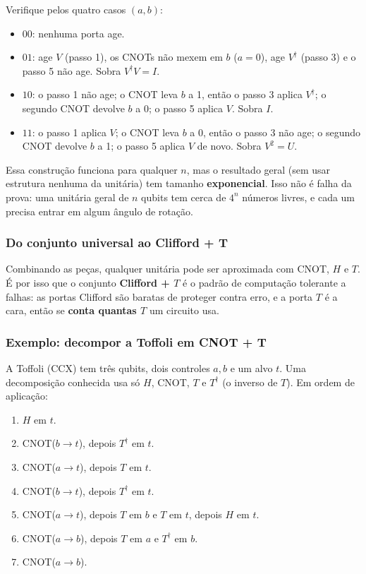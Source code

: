 Verifique pelos quatro casos \((a,b)\):

\begin{itemize}
\tightlist
\item
  \(00\): nenhuma porta age.
\item
  \(01\): age \(V\) (passo 1), os CNOTs não mexem em \(b\) (\(a=0\)), age \(V^\dagger\) (passo 3) e o passo 5 não age. Sobra \(V^\dagger V = I\).
\item
  \(10\): o passo 1 não age; o CNOT leva \(b\) a 1, então o passo 3 aplica \(V^\dagger\); o segundo CNOT devolve \(b\) a 0; o passo 5 aplica \(V\). Sobra \(I\).
\item
  \(11\): o passo 1 aplica \(V\); o CNOT leva \(b\) a 0, então o passo 3 não age; o segundo CNOT devolve \(b\) a 1; o passo 5 aplica \(V\) de novo. Sobra \(V^2=U\).
\end{itemize}

Essa construção funciona para qualquer \(n\), mas o resultado geral (sem usar estrutura nenhuma da unitária) tem tamanho \textbf{exponencial}. Isso não é falha da prova: uma unitária geral de \(n\) qubits tem cerca de \(4^n\) números livres, e cada um precisa entrar em algum ângulo de rotação.

\subsubsection{Do conjunto universal ao Clifford + T}\label{do-conjunto-universal-ao-clifford-t}

Combinando as peças, qualquer unitária pode ser aproximada com CNOT, \(H\) e \(T\). É por isso que o conjunto \textbf{Clifford + \(T\)} é o padrão de computação tolerante a falhas: as portas Clifford são baratas de proteger contra erro, e a porta \(T\) é a cara, então se \textbf{conta quantas \(T\)} um circuito usa.

\subsubsection{Exemplo: decompor a Toffoli em CNOT + T}\label{exemplo-decompor-a-toffoli-em-cnot-t}

A Toffoli (CCX) tem três qubits, dois controles \(a,b\) e um alvo \(t\). Uma decomposição conhecida usa só \(H\), CNOT, \(T\) e \(T^\dagger\) (o inverso de \(T\)). Em ordem de aplicação:

\begin{enumerate}
\def\labelenumi{\arabic{enumi}.}
\tightlist
\item
  \(H\) em \(t\).
\item
  CNOT(\(b\to t\)), depois \(T^\dagger\) em \(t\).
\item
  CNOT(\(a\to t\)), depois \(T\) em \(t\).
\item
  CNOT(\(b\to t\)), depois \(T^\dagger\) em \(t\).
\item
  CNOT(\(a\to t\)), depois \(T\) em \(b\) e \(T\) em \(t\), depois \(H\) em \(t\).
\item
  CNOT(\(a\to b\)), depois \(T\) em \(a\) e \(T^\dagger\) em \(b\).
\item
  CNOT(\(a\to b\)).
\end{enumerate}

